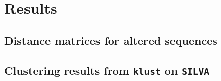 \section{Results}

\subsection{Distance matrices for altered sequences}

%
%
%
%
%
%
%


\newpage
\subsection{Clustering results from \texttt{klust} on \texttt{SILVA}}

